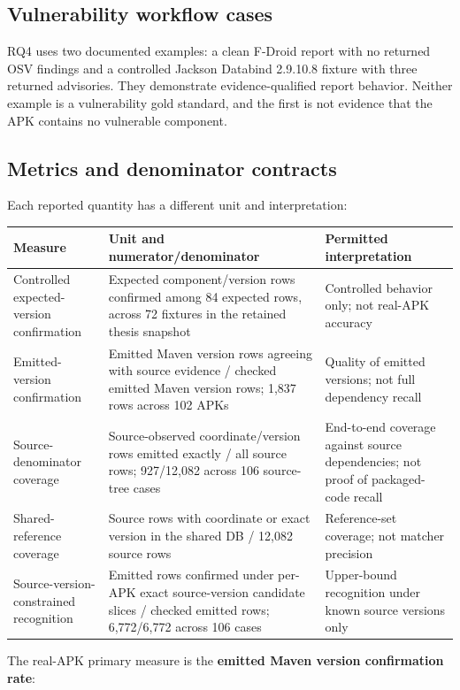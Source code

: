 \documentclass[10pt,twocolumn]{article}
\begin{document}
\subsection{Vulnerability workflow cases}
RQ4 uses two documented examples: a clean F-Droid report with no returned OSV findings and a controlled Jackson Databind 2.9.10.8 fixture with three returned advisories. They demonstrate evidence-qualified report behavior. Neither example is a vulnerability gold standard, and the first is not evidence that the APK contains no vulnerable component.
\subsection{Metrics and denominator contracts}
Each reported quantity has a different unit and interpretation:
\begin{center}\small\begin{tabularx}{\columnwidth}{@{}X@{}X@{}X@{}}
\textbf{Measure} & \textbf{Unit and numerator/denominator} & \textbf{Permitted interpretation} \\
\midrule
Controlled expected-version confirmation & Expected component/version rows confirmed among 84 expected rows, across 72 fixtures in the retained thesis snapshot & Controlled behavior only; not real-APK accuracy \\
Emitted-version confirmation & Emitted Maven version rows agreeing with source evidence / checked emitted Maven version rows; 1,837 rows across 102 APKs & Quality of emitted versions; not full dependency recall \\
Source-denominator coverage & Source-observed coordinate/version rows emitted exactly / all source rows; 927/12,082 across 106 source-tree cases & End-to-end coverage against source dependencies; not proof of packaged-code recall \\
Shared-reference coverage & Source rows with coordinate or exact version in the shared DB / 12,082 source rows & Reference-set coverage; not matcher precision \\
Source-version-constrained recognition & Emitted rows confirmed under per-APK exact source-version candidate slices / checked emitted rows; 6,772/6,772 across 106 cases & Upper-bound recognition under known source versions only \\
\end{tabularx}\end{center}
The real-APK primary measure is the \textbf{emitted Maven version confirmation rate}:
\begin{center}\end{center}
\end{document}

